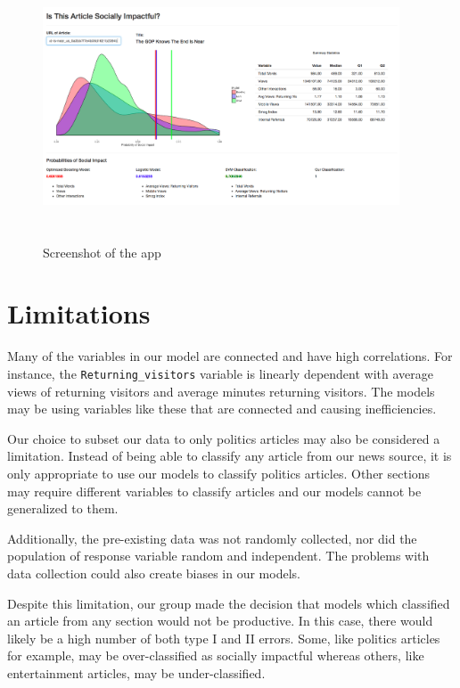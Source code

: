 \documentclass[10pt,letterpaper]{article}
\begin{document}
\begin{figure}
\includegraphics[width=400px,height=300px]{app} \caption{Screenshot of the app}\label{fig:unnamed-chunk-9}
\end{figure}

\section{Limitations}\label{limitations}

Many of the variables in our model are connected and have high
correlations. For instance, the \texttt{Returning\_visitors} variable is
linearly dependent with average views of returning visitors and average
minutes returning visitors. The models may be using variables like these
that are connected and causing inefficiencies.

Our choice to subset our data to only politics articles may also be
considered a limitation. Instead of being able to classify any article
from our news source, it is only appropriate to use our models to
classify politics articles. Other sections may require different
variables to classify articles and our models cannot be generalized to
them.

Additionally, the pre-existing data was not randomly collected, nor did
the population of response variable random and independent. The problems
with data collection could also create biases in our models.

Despite this limitation, our group made the decision that models which
classified an article from any section would not be productive. In this
case, there would likely be a high number of both type I and II errors.
Some, like politics articles for example, may be over-classified as
socially impactful whereas others, like entertainment articles, may be
under-classified.
\end{document}
